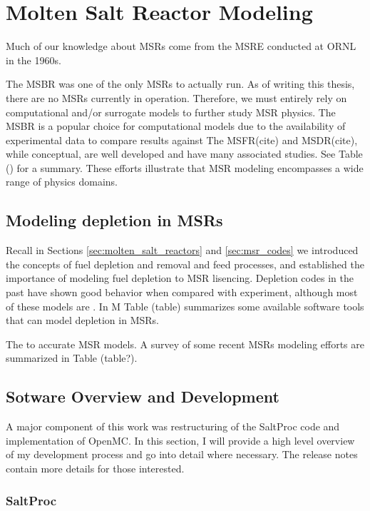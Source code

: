 \chapter{Molten Salt Reactor Modeling}%
\label{cha:msr_modeling}
Much of our knowledge about \Gls{MSR}s come from the \Gls{MSRE} conducted at \Gls{ORNL} in the 1960s.

The \Gls{MSBR} was one of the only \Gls{MSR}s to actually run. As of writing this thesis, there are no \Gls{MSR}s currently in operation. Therefore, we must entirely rely on computational and/or surrogate models to further study \Gls{MSR} physics. The \Gls{MSBR} is a popular choice for computational models due to the availability of experimental data to compare results against %
The \Gls{MSFR}(cite) and \Gls{MSDR}(cite), while conceptual, are well developed and have many associated studies. See Table () for a summary. These efforts illustrate that \Gls{MSR} modeling encompasses a wide range of physics domains.


\section{Modeling depletion in \Gls{MSR}s}
Recall in Sections
\ref{sec:molten_salt_reactors} and \ref{sec:msr_codes} we introduced the concepts of fuel depletion and removal and feed processes, and established the importance of modeling fuel depletion to \Gls{MSR} lisencing. Depletion codes in the past have shown good behavior when compared with experiment, although most of these models are . In M Table (table) summarizes some available software tools that can model depletion in \Gls{MSR}s.


The to accurate \Gls{MSR} models.
A survey of some recent \Gls{MSR}s modeling efforts are summarized in Table (table?). 

\section{Sotware Overview and Development}
\label{sec:soft_dev}
A major component of this work was restructuring of the SaltProc code and implementation of OpenMC. In this section, I will provide a high level overview of my development process and go into detail where necessary. The release notes contain more details for those interested.
\subsection{SaltProc}%
\label{sub:saltproc}

